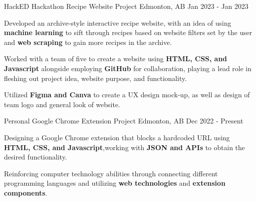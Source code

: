 

\begin{cventries}

  
   \cventry
    {HackED Hackathon} %
    {Recipe Website Project} %
    {Edmonton, AB} %
    {Jan 2023 - Jan 2023} %
    {
      \begin{cvitems} %
        \item {Developed an archive-style interactive recipe website, with an idea of using \textbf{machine learning} to sift through recipes based on website filters set by the user and \textbf{web scraping} to gain more recipes in the archive.}
        \item {Worked with a team of five to create a website using \textbf{HTML, CSS, and Javascript} alongside employing \textbf{GitHub} for collaboration, playing a lead role in fleshing out project idea, website purpose, and functionality.}
        \item {Utilized \textbf{Figma and Canva} to create a UX design mock-up, as well as design of team logo and general look of website.}
      \end{cvitems}
    }
    
    \cventry
    {Personal} %
    {Google Chrome Extension Project} %
    {Edmonton, AB} %
    {Dec 2022 - Present} %
    {
      \begin{cvitems} %
        \item {Designing a Google Chrome extension that blocks a hardcoded URL using \textbf{HTML, CSS, and Javascript},working with \textbf{JSON and APIs} to obtain the desired functionality.}
        \item {Reinforcing computer technology abilities through connecting different programming languages and utilizing \textbf{web technologies} and \textbf{extension components}.}
      \end{cvitems}
    }
  

\end{cventries}
